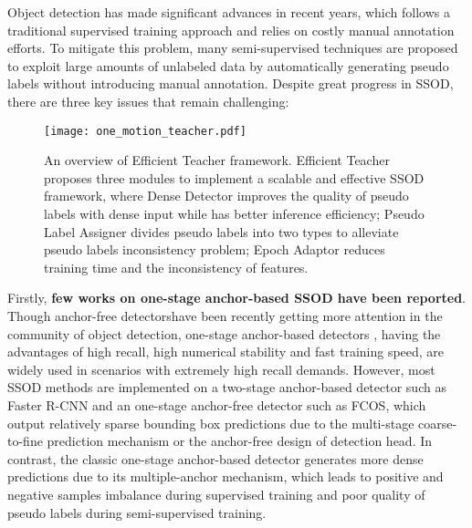 \documentclass[10pt,twocolumn,letterpaper]{article}
\begin{document}
Object detection\cite{lin2017focal,ren2015faster,tian2019fcos,cai2018cascade} has made significant advances in recent years, which follows a traditional supervised training approach and relies on costly manual annotation efforts. To mitigate this problem, many semi-supervised techniques\cite{sohn2020fixmatch,berthelot2019mixmatch} are proposed to exploit large amounts of unlabeled data by automatically generating pseudo labels without introducing manual annotation. Despite great progress in SSOD\cite{chen2022label,chen2022dense,xu2021end,liu2021unbiased}, there are three key issues that remain challenging:
\begin{figure*}[ht]
    \centering \texttt{[image: one\_motion\_teacher.pdf]}
\caption{An overview of Efficient Teacher framework. Efficient Teacher proposes three modules to implement a scalable and
    effective SSOD framework, where Dense Detector improves the quality of pseudo labels with dense input while has better inference efficiency; Pseudo Label Assigner divides pseudo labels into two types to alleviate pseudo labels inconsistency problem; Epoch Adaptor reduces training time and the inconsistency of features.}
    \label{Fig.efficient_teacher_arch}
\end{figure*}

Firstly, \textbf{few works on one-stage anchor-based SSOD have been reported}. Though anchor-free detectors\cite{ge2021yolox, tian2019fcos, li2022yolov6}have been recently getting
more attention in the community of object detection, one-stage anchor-based detectors \cite{redmon2018yolov3,bochkovskiy2020yolov4,jocher2022ultralytics,li2022yolov6,wang2022yolov7}, having the advantages of high recall, high numerical stability and fast training speed,  are widely used in scenarios with extremely high recall demands. However, most SSOD methods are implemented on a two-stage anchor-based detector such as Faster R-CNN\cite{ren2015faster} and an one-stage anchor-free detector such as FCOS\cite{tian2019fcos}, which output relatively sparse bounding box predictions due to the multi-stage coarse-to-fine prediction mechanism or the anchor-free design of detection head. In contrast, the classic one-stage anchor-based detector generates more dense predictions due to 
its multiple-anchor mechanism, which leads to positive and negative samples imbalance during supervised training\cite{zhang2020bridging} and poor quality of pseudo labels during semi-supervised training.
\end{document}
